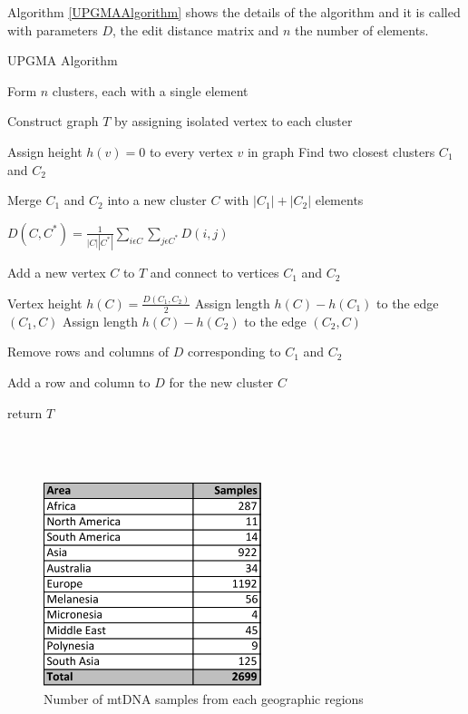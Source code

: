 \documentclass[conference]{IEEEtran}
\begin{document}
Algorithm \ref{UPGMAAlgorithm} shows the details of the algorithm and it is called with parameters $D$, the edit distance matrix and $n$ the number of elements.
\begin{minipage}{\linewidth}
  \begin{algorithm}[H]
    \caption{UPGMA Algorithm}\label{UPGMAAlgorithm}
    \begin{algorithmic}[1]
        \State Form $n$ clusters, each with a single element
        \State \parbox[t]{\dimexpr\linewidth-\algorithmicindent}{Construct graph $T$ by assigning isolated vertex to each cluster\strut}
        \State Assign height $h(v) = 0$ to every vertex $v$ in graph
          \State Find two closest clusters $C_1$ and $C_2$
          \State \parbox[t]{\dimexpr\linewidth-\algorithmicindent}{Merge $C_1$ and $C_2$ into a new cluster $C$ with $\left | C_1 \right | + \left | C_2 \right  |$ elements\strut}
            \State \parbox[t]{\dimexpr\linewidth-\algorithmicindent}{$D(C, C^*) =\frac{1}{\left | C \right | \left | C^* \right |} \sum_{i \epsilon C} \sum_{j \epsilon C^*} D\left (i, j \right )$\strut}
          \EndFor
          \State  \parbox[t]{\dimexpr\linewidth-\algorithmicindent}{Add a new vertex $C$ to $T$ and connect to vertices $C_1$ and $C_2$\strut}
          \State Vertex height $h(C) = \frac{D(C_1, C_2)}{2}$
          \State Assign length $h(C) - h(C_1)$ to the edge $(C_1, C)$
          \State Assign length $h(C) - h(C_2)$ to the edge $(C_2, C)$
          \State \parbox[t]{\dimexpr\linewidth-\algorithmicindent}{Remove rows and columns of $D$ corresponding to $C_1$ and $C_2$\strut}
          \State \parbox[t]{\dimexpr\linewidth-\algorithmicindent}{Add a row and column to $D$ for the new cluster $C$\strut}
        \EndWhile
       \State return $T$
      \EndProcedure
    \end{algorithmic}
  \end{algorithm}
\end{minipage}\\\\

\begin{figure}[!t]
\centering
\includegraphics[width=2.5in]{./figures/DataSize.pdf}
\caption{Number of mtDNA samples from each geographic regions}
\label{DataSize}
\end{figure}
\end{document}
